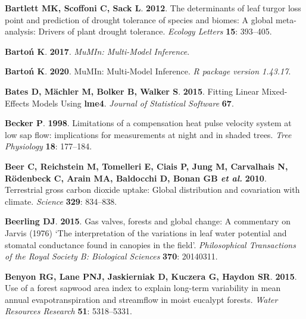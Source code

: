 \documentclass[11pt,twoside]{reedthesis}
\begin{document}
\hypertarget{ref-bartlett_determinants_2012}{}
\textbf{\textnormal{Bartlett MK}, \textnormal{Scoffoni C},
\textnormal{Sack L}}. \textbf{2012}. The determinants of leaf turgor
loss point and prediction of drought tolerance of species and biomes: A
global meta-analysis: Drivers of plant drought tolerance. \emph{Ecology
Letters} \textbf{15}: 393--405.

\hypertarget{ref-Barton2017}{}
\textbf{\textnormal{Bartoń K}}. \textbf{2017}. \emph{MuMIn: Multi-Model
Inference}.

\hypertarget{ref-barton_mumin_2020}{}
\textbf{\textnormal{Bartoń K}}. \textbf{2020}. MuMIn: Multi-Model
Inference. \emph{R package version 1.43.17}.

\hypertarget{ref-Bates2015}{}
\textbf{\textnormal{Bates D}, \textnormal{Mächler M}, \textnormal{Bolker
B}, \textnormal{Walker S}}. \textbf{2015}. Fitting Linear Mixed-Effects
Models Using \textbf{lme4}. \emph{Journal of Statistical Software}
\textbf{67}.

\hypertarget{ref-Becker1998}{}
\textbf{\textnormal{Becker P}}. \textbf{1998}. Limitations of a
compensation heat pulse velocity system at low sap flow: implications
for measurements at night and in shaded trees. \emph{Tree Physiology}
\textbf{18}: 177--184.

\hypertarget{ref-Beer2010}{}
\textbf{\textnormal{Beer C}, \textnormal{Reichstein M},
\textnormal{Tomelleri E}, \textnormal{Ciais P}, \textnormal{Jung M},
\textnormal{Carvalhais N}, \textnormal{Rödenbeck C}, \textnormal{Arain
MA}, \textnormal{Baldocchi D}, \textnormal{Bonan GB} \emph{et al.}}
\textbf{2010}. Terrestrial gross carbon dioxide uptake: Global
distribution and covariation with climate. \emph{Science} \textbf{329}:
834--838.

\hypertarget{ref-beerling_gas_2015}{}
\textbf{\textnormal{Beerling DJ}}. \textbf{2015}. Gas valves, forests
and global change: A commentary on Jarvis (1976) `The interpretation of
the variations in leaf water potential and stomatal conductance found in
canopies in the field'. \emph{Philosophical Transactions of the Royal
Society B: Biological Sciences} \textbf{370}: 20140311.

\hypertarget{ref-Benyon2015}{}
\textbf{\textnormal{Benyon RG}, \textnormal{Lane PNJ},
\textnormal{Jaskierniak D}, \textnormal{Kuczera G}, \textnormal{Haydon
SR}}. \textbf{2015}. Use of a forest sapwood area index to explain
long-term variability in mean annual evapotranspiration and streamflow
in moist eucalypt forests. \emph{Water Resources Research} \textbf{51}:
5318--5331.
\end{document}
